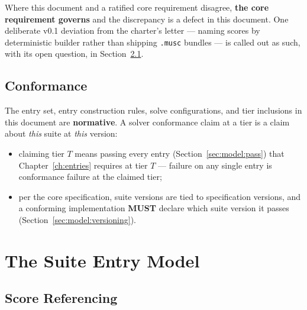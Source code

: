 \documentclass[11pt,letterpaper]{report}
\newcounter{requirement}[chapter]
\newcommand{\MUST}{\textbf{MUST}}
\begin{document}
Where this document and a ratified core requirement disagree, \textbf{the
core requirement governs} and the discrepancy is a defect in this
document. One deliberate v0.1 deviation from the charter's letter ---
naming scores by deterministic builder rather than shipping
\texttt{.musc} bundles --- is called out as such, with its open question,
in Section~\ref{sec:model:referencing}.

\section{Conformance}
\label{sec:about:conformance}

The entry set, entry construction rules, solve configurations, and tier
inclusions in this document are \textbf{normative}. A solver conformance
claim at a tier is a claim about \emph{this} suite at \emph{this}
version:

\begin{itemize}
  \item claiming tier $T$ means passing every entry
    (Section~\ref{sec:model:pass}) that Chapter~\ref{ch:entries} requires
    at tier $T$ --- failure on any single entry is conformance failure at
    the claimed tier;
  \item per the core specification, suite versions are tied to
    specification versions, and a conforming implementation \MUST{}
    declare which suite version it passes
    (Section~\ref{sec:model:versioning}).
\end{itemize}

\chapter{The Suite Entry Model}
\label{ch:model}

\section{Score Referencing}
\label{sec:model:referencing}
\end{document}
